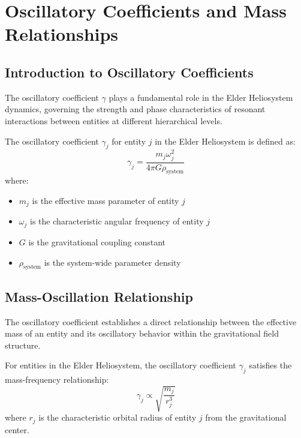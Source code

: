 \chapter{Oscillatory Coefficients and Mass Relationships}

\section{Introduction to Oscillatory Coefficients}

The oscillatory coefficient $\gamma$ plays a fundamental role in the Elder Heliosystem dynamics, governing the strength and phase characteristics of resonant interactions between entities at different hierarchical levels.

\begin{definition}
The oscillatory coefficient $\gamma_j$ for entity $j$ in the Elder Heliosystem is defined as:
\begin{equation}
\gamma_j = \frac{m_j \omega_j^2}{4\pi G \rho_{\text{system}}}
\end{equation}
where:
\begin{itemize}
    \item $m_j$ is the effective mass parameter of entity $j$
    \item $\omega_j$ is the characteristic angular frequency of entity $j$
    \item $G$ is the gravitational coupling constant
    \item $\rho_{\text{system}}$ is the system-wide parameter density
\end{itemize}
\end{definition}

\section{Mass-Oscillation Relationship}

The oscillatory coefficient establishes a direct relationship between the effective mass of an entity and its oscillatory behavior within the gravitational field structure.

\begin{theorem}
For entities in the Elder Heliosystem, the oscillatory coefficient $\gamma_j$ satisfies the mass-frequency relationship:
\begin{equation}
\gamma_j \propto \sqrt{\frac{m_j}{r_j^3}}
\end{equation}
where $r_j$ is the characteristic orbital radius of entity $j$ from the gravitational center.
\end{theorem}

